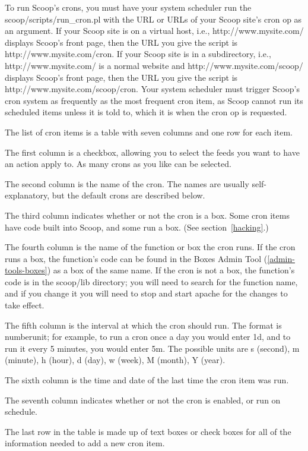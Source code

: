 To run Scoop's crons, you must have your system scheduler run the scoop/scripts/run\_cron.pl with the URL or URLs of your Scoop site's cron op as an argument.  If your Scoop site is on a virtual host, i.e., http://www.mysite.com/ displays Scoop's front page, then the URL you give the script is http://www.mysite.com/cron.  If your Scoop site is in a subdirectory, i.e., http://www.mysite.com/ is a normal website and http://www.mysite.com/scoop/ displays Scoop's front page, then the URL you give the script is http://www.mysite.com/scoop/cron.  Your system scheduler must trigger Scoop's cron system as frequently as the most frequent cron item, as Scoop cannot run its scheduled items unless it is told to, which it is when the cron op is requested.

The list of cron items is a table with seven columns and one row for each item.

The first column is a checkbox, allowing you to select the feeds you want to have an action apply to.  As many crons as you like can be selected.

The second column is the name of the cron.  The names are usually self-explanatory, but the default crons are described below.

The third column indicates whether or not the cron is a box.  Some cron items have code built into Scoop, and some run a box.  (See section~\ref{hacking}.)

The fourth column is the name of the function or box the cron runs.  If the cron runs a box, the function's code can be found in the Boxes Admin Tool (\ref{admin-tools-boxes}) as a box of the same name. If the cron is not a box, the function's code is in the scoop/lib directory; you will need to search for the function name, and if you change it you will need to stop and start apache for the changes to take effect.

The fifth column is the interval at which the cron should run.  The format is \latexhtml{$<$}{<}number\latexhtml{$>$}{>}\latexhtml{$<$}{<}unit\latexhtml{$>$}{>}; for example, to run a cron once a day you would enter 1d, and to run it every 5 minutes, you would enter 5m.  The possible units are s (second), m (minute), h (hour), d (day), w (week), M (month), Y (year).

The sixth column is the time and date of the last time the cron item was run.

The seventh column indicates whether or not the cron is enabled, or run on schedule.

The last row in the table is made up of text boxes or check boxes for all of the information needed to add a new cron item.

